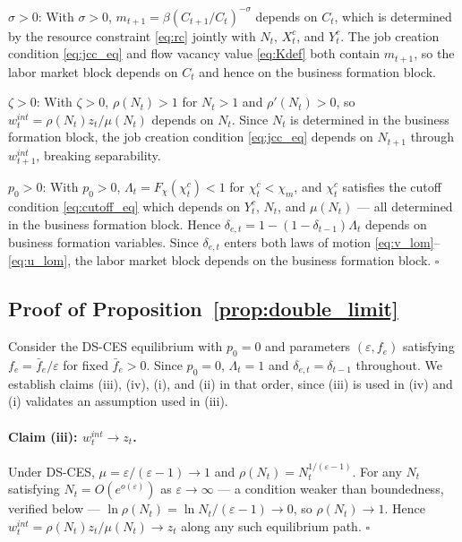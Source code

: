 \documentclass[authoryear, review, 12pt]{elsarticle}
\begin{document}
\emph{$\sigma>0$}: With $\sigma>0$, 
$m_{t+1}=\beta(C_{t+1}/C_t)^{-\sigma}$ depends on 
$C_t$, which is determined by the resource 
constraint \eqref{eq:rc} jointly with $N_t$, 
$X_t^c$, and $Y_t^c$. The job creation condition 
\eqref{eq:jcc_eq} and flow vacancy value 
\eqref{eq:Kdef} both contain $m_{t+1}$, so the 
labor market block depends on $C_t$ and hence on 
the business formation block.

\emph{$\zeta>0$}: With $\zeta>0$, $\rho(N_t)>1$ 
for $N_t>1$ and $\rho'(N_t)>0$, so 
$w_t^{int}=\rho(N_t)z_t/\mu(N_t)$ depends on $N_t$. 
Since $N_t$ is determined in the business formation 
block, the job creation condition \eqref{eq:jcc_eq} 
depends on $N_{t+1}$ through $w_{t+1}^{int}$, 
breaking separability.

\emph{$p_0>0$}: With $p_0>0$, 
$\Lambda_t=F_\chi(\chi_t^c)<1$ for $\chi_t^c<\chi_m$, 
and $\chi_t^c$ satisfies the cutoff condition 
\eqref{eq:cutoff_eq} which depends on $Y_t^c$, 
$N_t$, and $\mu(N_t)$ --- all determined in the 
business formation block. Hence 
$\delta_{e,t}=1-(1-\delta_{t-1})\Lambda_t$ depends 
on business formation variables. Since $\delta_{e,t}$ 
enters both laws of motion 
\eqref{eq:v_lom}--\eqref{eq:u_lom}, the labor 
market block depends on the business formation 
block. \hfill$\square$

\subsection*{Proof of Proposition~\ref{prop:double_limit}}

Consider the DS-CES equilibrium with $p_0=0$ and 
parameters $(\varepsilon, f_e)$ satisfying 
$f_e=\bar{f}_e/\varepsilon$ for fixed $\bar{f}_e>0$. 
Since $p_0=0$, $\Lambda_t=1$ and 
$\delta_{e,t}=\delta_{t-1}$ throughout. We establish 
claims (iii), (iv), (i), and (ii) in that order, 
since (iii) is used in (iv) and (i) validates an 
assumption used in (iii).

\paragraph{Claim (iii): $w_t^{int}\to z_t$.}
Under DS-CES, $\mu=\varepsilon/(\varepsilon-1)\to 1$ 
and $\rho(N_t)=N_t^{1/(\varepsilon-1)}$. For any 
$N_t$ satisfying $N_t = O(e^{o(\varepsilon)})$ as 
$\varepsilon\to\infty$ --- a condition weaker than 
boundedness, verified below --- 
$\ln\rho(N_t) = \ln N_t/(\varepsilon-1)\to 0$, so 
$\rho(N_t)\to 1$. Hence 
$w_t^{int}=\rho(N_t)z_t/\mu(N_t)\to z_t$ along 
any such equilibrium path. $\square$
\end{document}
